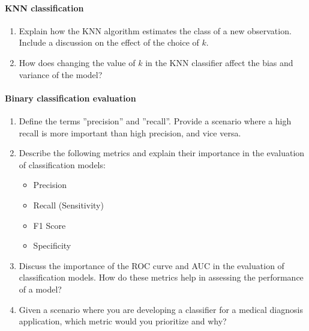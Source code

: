 \paragraph*{KNN classification}
\begin{enumerate}
    \item Explain how the KNN algorithm estimates the class of a new observation. Include a discussion on the effect of the choice of \( k \).
    \item How does changing the value of \( k \) in the KNN classifier affect the bias and variance of the model?
\end{enumerate}
\paragraph*{Binary classification evaluation}
\begin{enumerate}
    \item Define the terms ''precision'' and ''recall''. Provide a scenario where a high recall is more important than high precision, and vice versa.
    \item Describe the following metrics and explain their importance in the evaluation of classification models:
    \begin{itemize}
        \item Precision
        \item Recall (Sensitivity)
        \item F1 Score
        \item Specificity
    \end{itemize}
    \item Discuss the importance of the ROC curve and AUC in the evaluation of classification models. How do these metrics help in assessing the performance of a model?
    \item Given a scenario where you are developing a classifier for a medical diagnosis application, which metric would you prioritize and why?
\end{enumerate}
